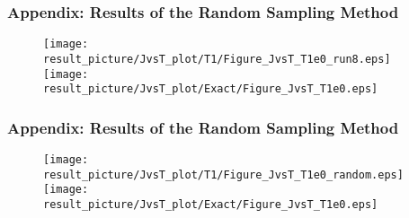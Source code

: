 \documentclass{beamer}
\begin{document}
\begin{frame}
	\frametitle{Appendix: Results of the Random Sampling Method}
	\begin{figure}
		\centering
		\texttt{[image: result\_picture/JvsT\_plot/T1/Figure\_JvsT\_T1e0\_run8.eps]}
		\hfill
		\texttt{[image: result\_picture/JvsT\_plot/Exact/Figure\_JvsT\_T1e0.eps]}		
		
	\end{figure}
\end{frame}

\begin{frame}
	\frametitle{Appendix: Results of the Random Sampling Method}
	\begin{figure}
		\centering
		\texttt{[image: result\_picture/JvsT\_plot/T1/Figure\_JvsT\_T1e0\_random.eps]}
		\hfill
		\texttt{[image: result\_picture/JvsT\_plot/Exact/Figure\_JvsT\_T1e0.eps]}		
		
	\end{figure}
\end{frame}

\end{document}

